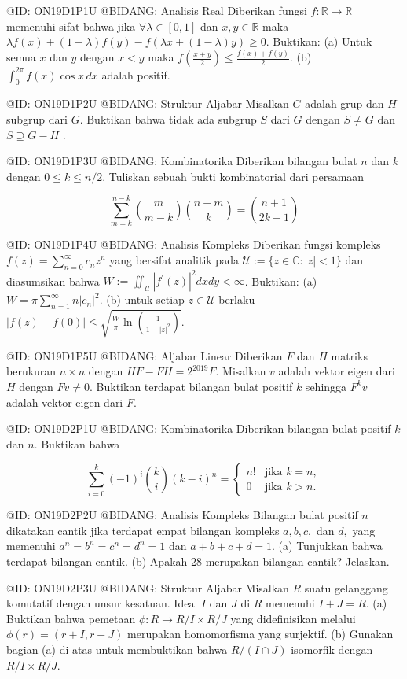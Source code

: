 @ID: ON19D1P1U
@BIDANG: Analisis Real
Diberikan fungsi $f:\mathbb{R}\rightarrow\mathbb{R}$ memenuhi sifat bahwa jika $\forall\lambda\in[0,1]$ dan $x,y\in\mathbb{R}$ maka $\lambda f(x)+(1-\lambda)f(y)-f(\lambda x+(1-\lambda)y)\ge0$. Buktikan:
(a) Untuk semua $x$ dan $y$ dengan $x<y$ maka $f(\frac{x+y}{2})\le\frac{f(x)+f(y)}{2}$.
(b) $\int_{0}^{2\pi}f(x)\cos x\,dx$ adalah positif.

@ID: ON19D1P2U
@BIDANG: Struktur Aljabar
Misalkan $G$ adalah grup dan $H$ subgrup dari $G$. Buktikan bahwa tidak ada subgrup $S$ dari $G$ dengan $S\ne G$ dan $S\supseteq G-H$ .

@ID: ON19D1P3U
@BIDANG: Kombinatorika
Diberikan bilangan bulat $n$ dan $k$ dengan $0\le k\le n/2$. Tuliskan sebuah bukti kombinatorial dari persamaan

$$
\sum_{m=k}^{n-k}\binom{m}{m-k}\binom{n-m}{k}=\binom{n+1}{2k+1}
$$



@ID: ON19D1P4U
@BIDANG: Analisis Kompleks
Diberikan fungsi kompleks $f(z)=\sum_{n=0}^{\infty}c_{n}z^{n}$ yang bersifat analitik pada $\mathcal{U}:=\{z\in\mathbb{C}:|z|<1\}$ dan diasumsikan bahwa $W:=\iint_{\mathcal{U}}|f^{\prime}(z)|^{2}dxdy<\infty$. Buktikan:
(a) $W=\pi\sum_{n=1}^{\infty}n|c_{n}|^{2}$.
(b) untuk setiap $z\in\mathcal{U}$ berlaku $|f(z)-f(0)|\le\sqrt{\frac{W}{\pi}\ln(\frac{1}{1-|z|^{2}})}$.

@ID: ON19D1P5U
@BIDANG: Aljabar Linear
Diberikan $F$ dan $H$ matriks berukuran $n\times n$ dengan $HF-FH=2^{2019}F$. Misalkan $v$ adalah vektor eigen dari $H$ dengan $Fv\ne0$. Buktikan terdapat bilangan bulat positif $k$ sehingga $F^{k}v$ adalah vektor eigen dari $F$.

@ID: ON19D2P1U
@BIDANG: Kombinatorika
Diberikan bilangan bulat positif $k$ dan $n$. Buktikan bahwa

$$
\sum_{i=0}^{k}(-1)^{i}\binom{k}{i}(k-i)^{n}=\begin{cases}n! & \text{jika } k=n, \\ 0 & \text{jika } k>n.\end{cases}
$$


@ID: ON19D2P2U
@BIDANG: Analisis Kompleks
Bilangan bulat positif $n$ dikatakan cantik jika terdapat empat bilangan kompleks $a, b, c,$ dan $d,$ yang memenuhi $a^{n}=b^{n}=c^{n}=d^{n}=1$ dan $a+b+c+d=1$.
(a) Tunjukkan bahwa terdapat bilangan cantik.
(b) Apakah 28 merupakan bilangan cantik? Jelaskan.

@ID: ON19D2P3U
@BIDANG: Struktur Aljabar
Misalkan $R$ suatu gelanggang komutatif dengan unsur kesatuan. Ideal $I$ dan $J$ di $R$ memenuhi $I+J=R$.
(a) Buktikan bahwa pemetaan $\phi:R\rightarrow R/I\times R/J$ yang didefinisikan melalui $\phi(r)=(r+I,r+J)$ merupakan homomorfisma yang surjektif.
(b) Gunakan bagian (a) di atas untuk membuktikan bahwa $R/(I\cap J)$ isomorfik dengan $R/I\times R/J$.


